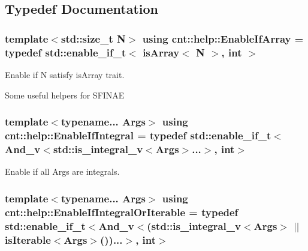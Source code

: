 \subsection{Typedef Documentation}
\subsubsection[{\texorpdfstring{Enable\+If\+Array}{EnableIfArray}}]{\setlength{\rightskip}{0pt plus 5cm}template$<$std\+::size\+\_\+t N$>$ using {\bf cnt\+::help\+::\+Enable\+If\+Array} = typedef std\+::enable\+\_\+if\+\_\+t$<$ {\bf is\+Array}$<$ N $>$, int $>$}\hypertarget{namespacecnt_1_1help_adf9d100b298c3b1342f7571dfbe1e3ac}{}\label{namespacecnt_1_1help_adf9d100b298c3b1342f7571dfbe1e3ac}


Enable if \textquotesingle{}N\textquotesingle{} satisfy \textquotesingle{}is\+Array\textquotesingle{} trait. 

Some useful helpers for S\+F\+I\+N\+AE 
\subsubsection[{\texorpdfstring{Enable\+If\+Integral}{EnableIfIntegral}}]{\setlength{\rightskip}{0pt plus 5cm}template$<$typename... Args$>$ using {\bf cnt\+::help\+::\+Enable\+If\+Integral} = typedef std\+::enable\+\_\+if\+\_\+t$<${\bf And\+\_\+v}$<${\bf std\+::is\+\_\+integral\+\_\+v}$<$Args$>$...$>$, int$>$}\hypertarget{namespacecnt_1_1help_aa87745c6be80922ee43c76953bfc5a74}{}\label{namespacecnt_1_1help_aa87745c6be80922ee43c76953bfc5a74}


Enable if all \textquotesingle{}Args\textquotesingle{} are integrals. 

\subsubsection[{\texorpdfstring{Enable\+If\+Integral\+Or\+Iterable}{EnableIfIntegralOrIterable}}]{\setlength{\rightskip}{0pt plus 5cm}template$<$typename... Args$>$ using {\bf cnt\+::help\+::\+Enable\+If\+Integral\+Or\+Iterable} = typedef std\+::enable\+\_\+if\+\_\+t$<${\bf And\+\_\+v}$<$({\bf std\+::is\+\_\+integral\+\_\+v}$<$Args$>$ $\vert$$\vert$ {\bf is\+Iterable}$<$Args$>$())...$>$, int$>$}\hypertarget{namespacecnt_1_1help_a6b660ad7dc1ea8aa67f0410733a0a3c9}{}\label{namespacecnt_1_1help_a6b660ad7dc1ea8aa67f0410733a0a3c9}



